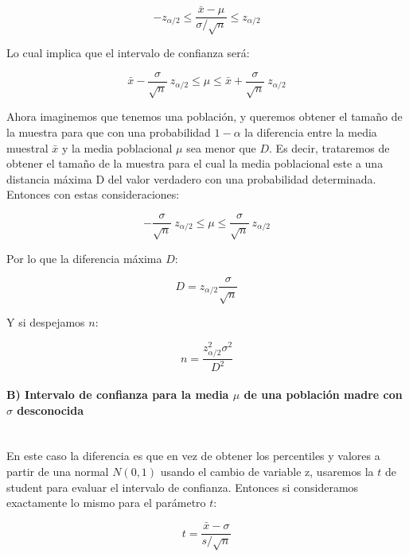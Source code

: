 \documentclass[12pt,a4paper]{book}
\begin{document}
\begin{equation}
- z_{\alpha/2} \leq  \dfrac{\bar{x}-\mu}{\sigma / \sqrt{n}} \leq z_{\alpha/2}
\end{equation}

Lo cual implica que el intervalo de confianza será:

\begin{equation}
\bar{x} - \frac{\sigma}{\sqrt{n}} \ z_{\alpha/2} \leq \mu \leq  \bar{x} + \frac{\sigma}{\sqrt{n}} \ z_{\alpha/2}
\end{equation}

Ahora imaginemos que tenemos una población, y queremos obtener el tamaño de la muestra para que con una probabilidad $1-\alpha$ la diferencia entre la media muestral $\bar{x}$ y la media poblacional $\mu$ sea menor que $D$. Es decir, trataremos de obtener el tamaño de la muestra para el cual la media poblacional este a una distancia máxima D del valor verdadero con una probabilidad determinada. Entonces con estas consideraciones:

\begin{equation}
 -\frac{\sigma}{\sqrt{n}} \ z_{\alpha/2}  \leq \mu \leq   \frac{\sigma}{\sqrt{n}} \ z_{\alpha/2}
\end{equation}

Por lo que la diferencia máxima $D$:

\begin{equation}
D = z_{\alpha/2}  \dfrac{\sigma}{\sqrt{n}}
\end{equation}

Y si despejamos $n$:

\begin{equation}
n =  \dfrac{z^2_{\alpha/2} \sigma^2}{D^2}
\end{equation}

\paragraph{B) Intervalo de confianza para la media $\mu$ de una población madre con $\sigma$ desconocida \\ \\}


En este caso la diferencia es que en vez de obtener los percentiles y valores a partir de una normal $N(0,1)$ usando el cambio de variable z, usaremos la $t$ de student para evaluar el intervalo de confianza. Entonces si consideramos exactamente lo mismo para el parámetro $t$:

$$  t = \dfrac{\bar{x}-\sigma}{s/\sqrt{n}}$$
\end{document}
